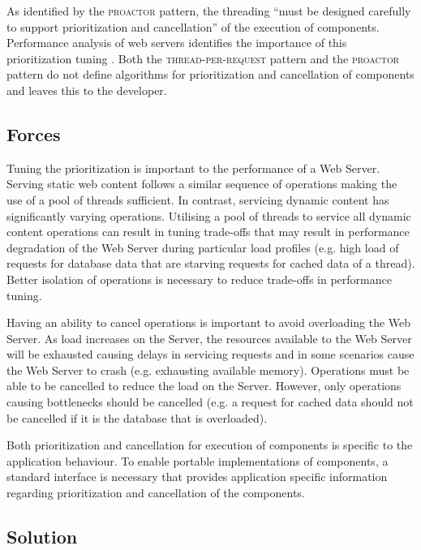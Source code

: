 \documentclass[prodmode]{style/acmlarge}
\begin{document}
As identified by the \textsc{proactor} pattern, the threading ``must be designed
carefully to support prioritization and cancellation'' \cite[p. 8]{proactor} of
the execution of components.  Performance analysis of web servers identifies the
importance of this prioritization tuning
\cite{tuning-important,low-server-footprint,tuning-os-important}.  Both the
\textsc{thread-per-request} pattern and the \textsc{proactor} pattern do not
define algorithms for prioritization and cancellation of components and leaves
this to the developer.


\subsection{Forces}

Tuning the prioritization is important to the performance of a Web Server.
Serving static web content follows a similar sequence of operations making the
use of a pool of threads sufficient.  In contrast, servicing dynamic content has
significantly varying operations.  Utilising a pool of threads to service all
dynamic content operations can result in tuning trade-offs that may result in
performance degradation of the Web Server during particular load profiles (e.g.
high load of requests for database data that are starving requests for cached
data of a thread).  Better isolation of operations is necessary to reduce
trade-offs in performance tuning.

Having an ability to cancel operations is important to avoid overloading the Web
Server.  As load increases on the Server, the resources available to the Web
Server will be exhausted causing delays in servicing requests and in some
scenarios cause the Web Server to crash (e.g. exhausting available memory). 
Operations must be able to be cancelled to reduce the load on the Server. 
However, only operations causing bottlenecks should be cancelled (e.g. a request
for cached data should not be cancelled if it is the database that is
overloaded).

Both prioritization and cancellation for execution of components is specific to
the application behaviour.  To enable portable implementations of components, a
standard interface is necessary that provides application specific information
regarding prioritization and cancellation of the components.


\subsection{Solution}
\end{document}
